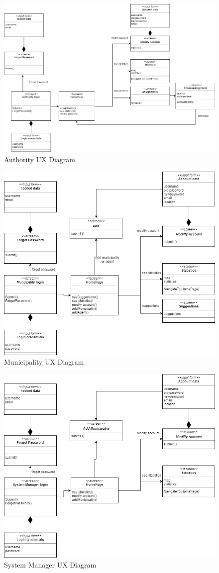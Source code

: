 \begin{figure}[h]
\centering
\includegraphics[width=\textwidth]{Images/ux2-correct.png}
\caption{\label{fig:ls}Authority UX Diagram }
\end{figure}
\begin{figure}[h]
\centering
\includegraphics[width=\textwidth]{Images/ux3-correct.png}
\caption{\label{fig:ls}Municipality UX Diagram}
\end{figure}
\begin{figure}[h]
\centering
\includegraphics[width=\textwidth]{Images/ux4-correct.png}
\caption{\label{fig:ls}System Manager UX Diagram }
\end{figure}
